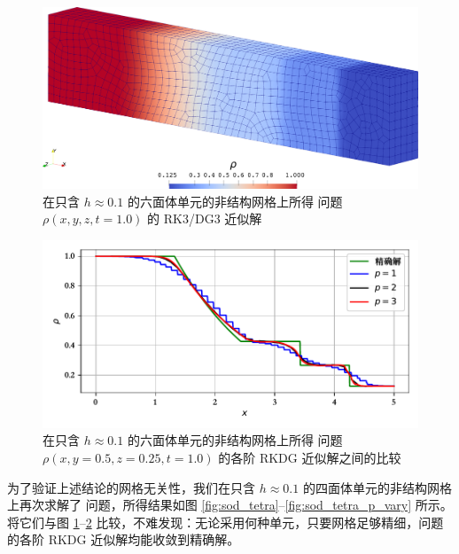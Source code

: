 \begin{figure}[h!]
\begin{centering}
\includegraphics[width=1\textwidth]{../mdpi/figures/shock_tubes/sod/contour}
\par\end{centering}
\caption{\label{fig:sod_hexa}在只含 $h\approx0.1$ 的六面体单元的非结构网格上所得 问题
$\rho(x,y,z,t=1.0)$ 的 RK3/DG3 近似解}
\end{figure}

\begin{figure}[h!]
\begin{centering}
\includegraphics[width=1\textwidth,height=0.3\textheight]{figures/shock_tubes/sod/result}
\par\end{centering}
\caption{\label{fig:sod_hexa_p_vary}在只含 $h\approx0.1$ 的六面体单元的非结构网格上所得 问题
$\rho(x,y=0.5,z=0.25,t=1.0)$ 的各阶 RKDG 近似解之间的比较}
\end{figure}

为了验证上述结论的网格无关性，我们在只含 $h\approx0.1$ 的四面体单元的非结构网格上再次求解了 问题，所得结果如图
\ref{fig:sod_tetra}–\ref{fig:sod_tetra_p_vary} 所示。将它们与图 \ref{fig:sod_hexa}–\ref{fig:sod_hexa_p_vary}
比较，不难发现：无论采用何种单元，只要网格足够精细，问题的各阶
RKDG 近似解均能收敛到精确解。

